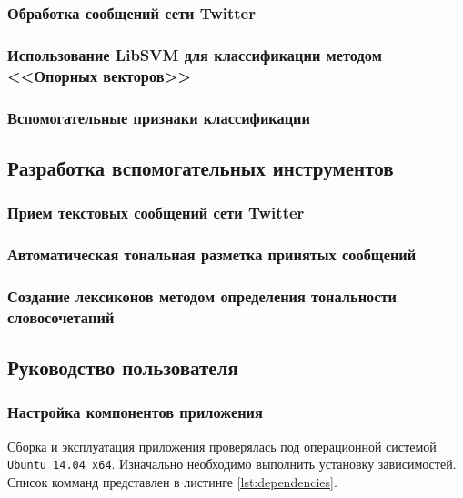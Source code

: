         \subsubsection{Обработка сообщений сети Twitter}

        \subsubsection{Использование LibSVM для классификации методом <<Опорных векторов>>}

        \subsubsection{Вспомогательные признаки классификации}

    \subsection{Разработка вспомогательных инструментов}
        \subsubsection{Прием текстовых сообщений сети Twitter}

        \subsubsection{Автоматическая тональная разметка принятых сообщений}

        \subsubsection{Создание лексиконов методом определения тональности словосочетаний}

    \subsection{Руководство пользователя}
        \subsubsection{Настройка компонентов приложения}
        Сборка и эксплуатация приложения проверялась под операционной системой
        {\tt Ubuntu 14.04 x64}. Изначально необходимо выполнить установку зависимостей.
        Список комманд представлен в листинге \ref{lst:dependencies}.
        \lstset{style=bash}
        


